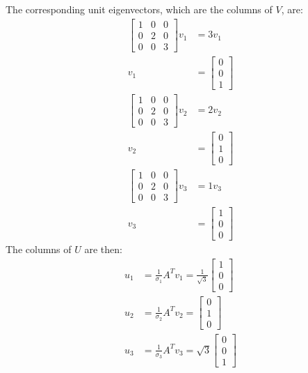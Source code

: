 \documentclass{article}
\begin{document}
The corresponding unit eigenvectors, which are the columns of $V$, are:
\begin{align*}
    \begin{bmatrix}
        1 & 0 & 0 \\ 0 & 2 & 0 \\ 0 & 0 & 3
    \end{bmatrix}v_1 & = 3v_1 \\
    v_1 & = \begin{bmatrix}
        0 \\ 0 \\ 1
    \end{bmatrix} \\
    \begin{bmatrix}
        1 & 0 & 0 \\ 0 & 2 & 0 \\ 0 & 0 & 3
    \end{bmatrix}v_2 & = 2v_2 \\
    v_2 & = \begin{bmatrix}
        0 \\ 1 \\ 0
    \end{bmatrix} \\
    \begin{bmatrix}
        1 & 0 & 0 \\ 0 & 2 & 0 \\ 0 & 0 & 3
    \end{bmatrix}v_3 & = 1v_3 \\
    v_3 & = \begin{bmatrix}
        1 \\ 0 \\ 0
    \end{bmatrix}
\end{align*}
The columns of $U$ are then:
\begin{align*}
    u_1 & = \frac{1}{\sigma_1}A^Tv_1 = \frac{1}{\sqrt{3}}\begin{bmatrix}
        1 \\ 0 \\ 0
    \end{bmatrix} \\
    u_2 & = \frac{1}{\sigma_2}A^Tv_2 = \begin{bmatrix}
        0 \\ 1 \\ 0
    \end{bmatrix} \\
    u_3 & = \frac{1}{\sigma_3}A^Tv_3 = \sqrt{3}\begin{bmatrix}
        0 \\ 0 \\ 1
    \end{bmatrix}
\end{align*}
\end{document}
